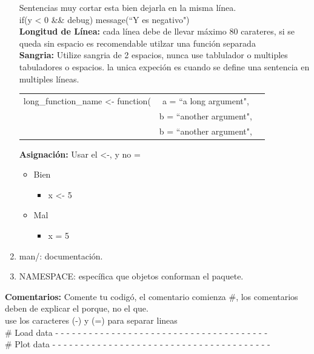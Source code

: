 \begin{enumerate}
Sentencias  muy cortar esta bien dejarla en la misma l\'inea.\\
if(y \textless \hspace{1mm} 0 \&\& debug) message(``Y es negativo")\\

\textbf{Longitud de L\'inea:} cada l\'inea debe de llevar m\'aximo 80 carateres, si se queda sin espacio es recomendable utilzar una funci\'on separada\\

\textbf{Sangria:} Utilize sangria de 2 espacios, nunca use tablulador o multiples tabuladores o espacios. la unica expeci\'on es cuando se define una sentencia en multiples l\'ineas.\\
\begin{tabular}{ccc}
long\_function\_name \textless- function(& a = ``a long argument", \\ 
 &  b = ``another argument", \\
 &  b = ``another argument", \\
\end{tabular}
\newline

\textbf{Asignaci\'on:} Usar el \textless-, y no =
\begin{itemize}
\item Bien  
\begin{itemize}
     \item x \textless- 5
  \end{itemize}
\item Mal
   \begin{itemize}
      \item x = 5
   \end{itemize}
 \end{itemize}

  \item man/: documentación.\\
  \item NAMESPACE: específica que objetos conforman el paquete.\\
\end{enumerate}
\textbf{Comentarios:} Comente tu codig\'o, el comentario comienza \#, los comentarios deben de explicar el porque, no el que.\\ use los caracteres (-) y (=) para separar lineas\\
{\# Load data - - - - - - - - - - - - - - - - - - - - - - - - - - - - - - - - - - - - - -}\\
{\# Plot data - - - - - - - - - - - - - - - - - - - - - - - - - - - - - - - - - - - - - - -}\\



